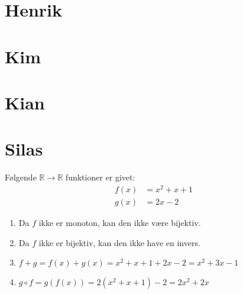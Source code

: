 \documentclass[12pt, a4paper]{article}
\begin{document}
\section{Henrik}
\section{Kim}
\section{Kian}
\section{Silas}
Følgende $\mathbb{R} \rightarrow \mathbb{R}$ funktioner er givet:
\begin{align*}
	f(x) & = x^2+x+1 \\
	g(x) & = 2x -2
\end{align*}
\begin{enumerate}[label=\alph*)]
	\item {
		Da $f$ ikke er monoton, kan den ikke være bijektiv.
	}
	\item {
		Da $f$ ikke er bijektiv, kan den ikke have en invers.
	}
	\item {
		$f+g=f(x)+g(x)=x^2+x+1+2x-2=x^2+3x-1$
	}
	\item {
		$g\circ f=g(f(x))=2(x^2+x+1)-2=2x^2+2x$
	}
\end{enumerate}
\end{document}
